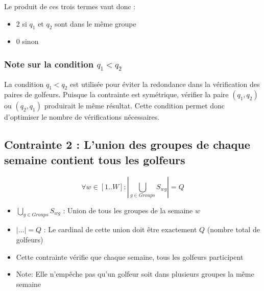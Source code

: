 \documentclass{article}
\begin{document}
Le produit de ces trois termes vaut donc :
\begin{itemize}
   \item 2 si $q_1$ et $q_2$ sont dans le même groupe
   \item 0 sinon
\end{itemize}

\subsubsection*{Note sur la condition $q_1 < q_2$}
La condition $q_1 < q_2$ est utilisée pour éviter la redondance dans la vérification des paires de golfeurs. Puisque la contrainte est symétrique, vérifier la paire $(q_1,q_2)$ ou $(q_2,q_1)$ produirait le même résultat. Cette condition permet donc d'optimiser le nombre de vérifications nécessaires.

\subsection*{Contrainte 2 : L'union des groupes de chaque semaine contient tous les golfeurs}
   \[ \forall w \in [1..W] : |\bigcup_{g \in Groups} S_{wg}| = Q \]
   \begin{itemize}[label=\textendash]
       \item $\bigcup_{g \in Groups} S_{wg}$ : Union de tous les groupes de la semaine $w$
       \item $|\dots| = Q$ : Le cardinal de cette union doit être exactement $Q$ (nombre total de golfeurs)
       \item Cette contrainte vérifie que chaque semaine, tous les golfeurs participent
       \item Note: Elle n'empêche pas qu'un golfeur soit dans plusieurs groupes la même semaine
   \end{itemize}
   
\end{document}
